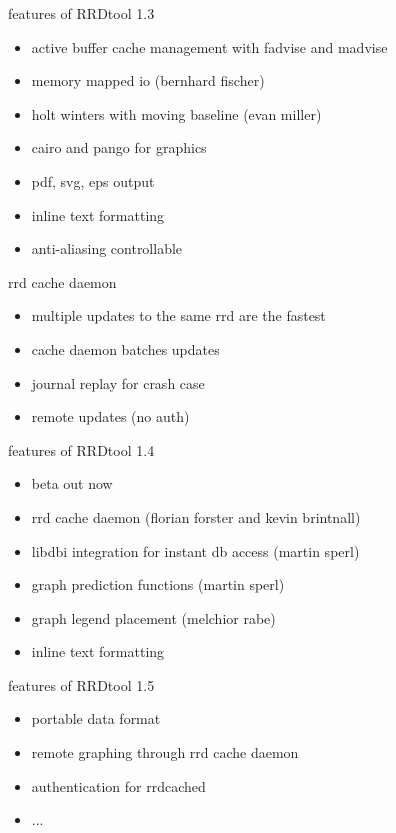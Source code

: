\begin{frame}{features of RRDtool 1.3}
\begin{itemize}
\item active buffer cache management with fadvise and madvise
\item memory mapped io (bernhard fischer)
\item holt winters with moving baseline (evan miller)
\item cairo and pango for graphics
\item pdf, svg, eps output
\item inline text formatting
\item anti-aliasing controllable
\end{itemize}
\end{frame}

\newpage

\begin{frame}{rrd cache daemon}
\begin{itemize}
\item multiple updates to the same rrd are the fastest
\item cache daemon batches updates
\item journal replay for crash case
\item remote updates (no auth)
\end{itemize}
\end{frame}

\begin{frame}{features of RRDtool 1.4}
\begin{itemize}
\item beta out now
\item rrd cache daemon (florian forster and kevin brintnall)
\item libdbi integration for instant db access (martin sperl)
\item graph prediction functions (martin sperl)
\item graph legend placement (melchior rabe)
\item inline text formatting
\end{itemize}
\end{frame}

\begin{frame}{features of RRDtool 1.5}
\begin{itemize}
\item portable data format
\item remote graphing through rrd cache daemon
\item authentication for rrdcached
\item ...
\end{itemize}
\end{frame}

